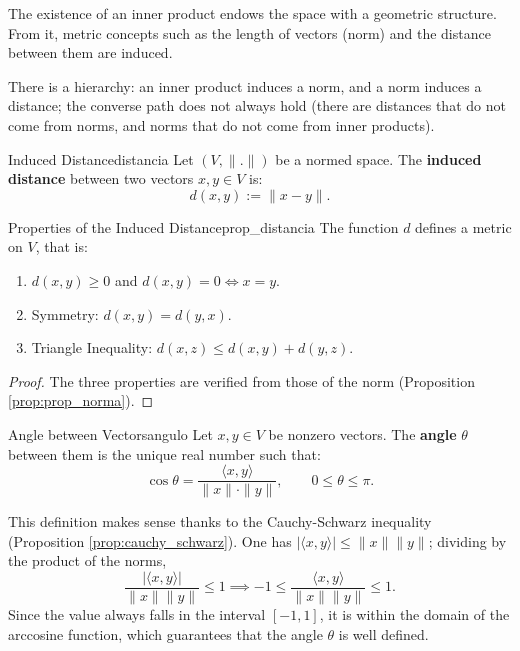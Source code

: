 \documentclass[11pt, a4paper]{article}
\begin{document}
The existence of an inner product endows the space with a geometric structure. From it, metric concepts such as the length of vectors (norm) and the distance between them are induced.

There is a hierarchy: an inner product induces a norm, and a norm induces a distance; the converse path does not always hold (there are distances that do not come from norms, and norms that do not come from inner products).

\begin{definicion}{Induced Distance}{distancia}
Let $(V,\|.\|)$ be a normed space. The \textbf{induced distance} between two vectors $x, y \in V$ is:
\[
d(x,y) := \|x-y\|.
\]
\end{definicion}

\begin{proposicion}{Properties of the Induced Distance}{prop_distancia}
The function $d$ defines a metric on $V$, that is:
\begin{enumerate}
    \item $d(x,y) \ge 0$ and $d(x,y)=0 \iff x=y$.
    \item Symmetry: $d(x,y) = d(y,x)$.
    \item Triangle Inequality: $d(x,z) \le d(x,y) + d(y,z)$.
\end{enumerate}
\end{proposicion}

\begin{proof}
The three properties are verified from those of the norm (Proposition \ref{prop:prop_norma}).
\end{proof}

\begin{definicion}{Angle between Vectors}{angulo}
Let $x, y \in V$ be nonzero vectors. The \textbf{angle} $\theta$ between them is the unique real number such that:
\[
\cos\theta = \frac{\langle x,y\rangle}{\|x\|\cdot\|y\|}, \qquad 0 \le \theta \le \pi.
\]
\end{definicion}

\obs This definition makes sense thanks to the Cauchy-Schwarz inequality (Proposition \ref{prop:cauchy_schwarz}).
One has $|\langle x, y \rangle| \le \|x\| \|y\|$; dividing by the product of the norms,
\[
\frac{|\langle x, y \rangle|}{\|x\| \|y\|} \le 1 \implies -1 \le \frac{\langle x, y \rangle}{\|x\| \|y\|} \le 1.
\]
Since the value always falls in the interval $[-1, 1]$, it is within the domain of the arccosine function, which guarantees that the angle $\theta$ is well defined.
\end{document}
